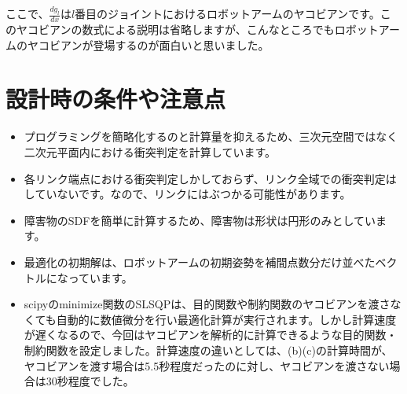 ここで、$\displaystyle \frac{dg_{l}}{dx}$は$l$番目のジョイントにおけるロボットアームのヤコビアンです。このヤコビアンの数式による説明は省略しますが、こんなところでもロボットアームのヤコビアンが登場するのが面白いと思いました。

\section{設計時の条件や注意点}
\begin{itemize}
  \item プログラミングを簡略化するのと計算量を抑えるため、三次元空間ではなく二次元平面内における衝突判定を計算しています。
  \item 各リンク端点における衝突判定しかしておらず、リンク全域での衝突判定はしていないです。なので、リンクにはぶつかる可能性があります。
  \item 障害物のSDFを簡単に計算するため、障害物は形状は円形のみとしています。
  \item 最適化の初期解は、ロボットアームの初期姿勢を補間点数分だけ並べたベクトルになっています。
  \item scipyのminimize関数のSLSQPは、目的関数や制約関数のヤコビアンを渡さなくても自動的に数値微分を行い最適化計算が実行されます。しかし計算速度が遅くなるので、今回はヤコビアンを解析的に計算できるような目的関数・制約関数を設定しました。計算速度の違いとしては、(b)(c)の計算時間が、ヤコビアンを渡す場合は5.5秒程度だったのに対し、ヤコビアンを渡さない場合は30秒程度でした。
\end{itemize}
